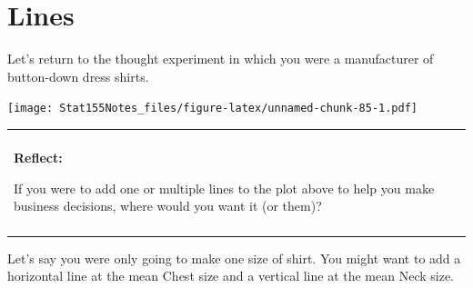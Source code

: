 \documentclass[]{book}
\newenvironment{Shaded}{\begin{snugshade}}{\end{snugshade}}
\newcommand{\DataTypeTok}[1]{\textcolor[rgb]{0.13,0.29,0.53}{#1}}
\newcommand{\KeywordTok}[1]{\textcolor[rgb]{0.13,0.29,0.53}{\textbf{#1}}}
\newcommand{\NormalTok}[1]{#1}
\newcommand{\OperatorTok}[1]{\textcolor[rgb]{0.81,0.36,0.00}{\textbf{#1}}}
\newcommand{\StringTok}[1]{\textcolor[rgb]{0.31,0.60,0.02}{#1}}
\newenvironment{reflect}
{
    \begin{center}
    
    \begin{tabular}{|p{0.8\textwidth}|}
    \rowcolor{LightBlue}
    \hline\\
    \rowcolor{LightBlue}
    \textbf{Reflect:}
}
{
    \\\rowcolor{LightBlue}
    \\\hline
    \end{tabular} 
    \end{center}
}
\begin{document}
\hypertarget{lines}{%
\section{Lines}\label{lines}}

Let's return to the thought experiment in which you were a manufacturer of button-down dress shirts.

\begin{Shaded}
\end{Shaded}

\texttt{[image: Stat155Notes\_files/figure-latex/unnamed-chunk-85-1.pdf]}

\begin{reflect}
If you were to add one or multiple lines to the plot above to help you
make business decisions, where would you want it (or them)?
\end{reflect}

Let's say you were only going to make one size of shirt. You might want to add a horizontal line at the mean Chest size and a vertical line at the mean Neck size.

\begin{Shaded}
\end{Shaded}
\end{document}
